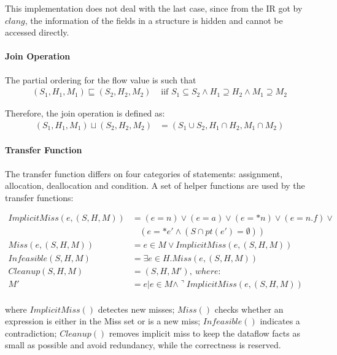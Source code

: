 This implementation does not deal with the last case, since from the 
\llvm IR got by $clang$, the information of the fields in a structure is 
hidden and cannot be accessed directly.

\paragraph{Join Operation}

The partial ordering for the flow value is such that 
\begin{align*}
  (S_1,H_1,M_1)\sqsubseteq (S_2,H_2,M_2) & \text{  iif  } 
  S_1\subseteq S_2 \wedge H_1\supseteq H_2 \wedge M_1\supseteq M_2
\end{align*}

Therefore, the join operation is defined as:
\begin{align*}
  (S_1,H_1,M_1)\sqcup (S_2,H_2,M_2) &= (S_1\cup S_2,H_1\cap H_2,M_1\cap M_2)
\end{align*}


\paragraph{Transfer Function}

The transfer function differs on four categories of statements: assignment, 
allocation, deallocation and condition. A set of helper functions are used 
by the transfer functions:

\begin{align*}
  ImplicitMiss(e,(S,H,M)) &= (e=n) \vee (e=a) \vee (e=*n) \vee (e=n.f) \vee \\
                          &\ \ \ \ (e=*e' \wedge (S\cap pt(e')=\emptyset)) \\
  Miss(e,(S,H,M)) &= e\in M \vee ImplicitMiss(e,(S,H,M)) \\
Infeasible(S,H,M) &= \exists e \in H. Miss(e,(S,H,M)) \\
   Cleanup(S,H,M) &= (S,H,M'), \ where: \\
  M' &= {e|e\in M \wedge \urcorner ImplicitMiss(e,(S,H,M))} \\
\end{align*}

where $ImplicitMiss()$ detectes new misses;
$Miss()$ checks whether an expression is either in the Miss set or is a new miss; 
$Infeasible()$ indicates a contradiction;
$Cleanup()$ removes implicit miss to keep the dataflow facts as small as possible 
and avoid redundancy, while the correctness is reserved.

